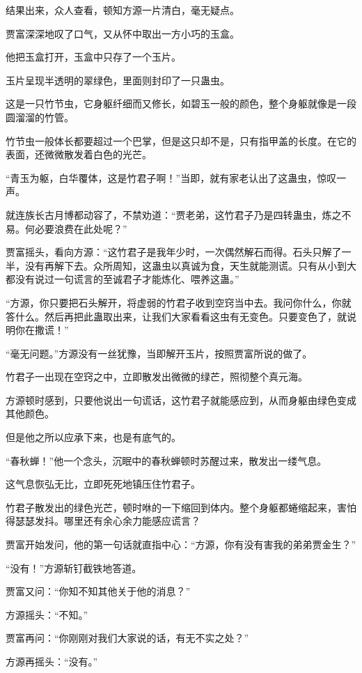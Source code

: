 \begin{this_body}
结果出来，众人查看，顿知方源一片清白，毫无疑点。

贾富深深地叹了口气，又从怀中取出一方小巧的玉盒。

他把玉盒打开，玉盒中只存了一个玉片。

玉片呈现半透明的翠绿色，里面则封印了一只蛊虫。

这是一只竹节虫，它身躯纤细而又修长，如碧玉一般的颜色，整个身躯就像是一段圆溜溜的竹管。

竹节虫一般体长都要超过一个巴掌，但是这只却不是，只有指甲盖的长度。在它的表面，还微微散发着白色的光芒。

“青玉为躯，白华覆体，这是竹君子啊！”当即，就有家老认出了这蛊虫，惊叹一声。

就连族长古月博都动容了，不禁劝道：“贾老弟，这竹君子乃是四转蛊虫，炼之不易。何必要浪费在此处呢？”

贾富摇头，看向方源：“这竹君子是我年少时，一次偶然解石而得。石头只解了一半，没有再解下去。众所周知，这蛊虫以真诚为食，天生就能测谎。只有从小到大都没有说过一句谎言的至诚君子才能炼化、喂养这蛊。”

“方源，你只要把石头解开，将虚弱的竹君子收到空窍当中去。我问你什么，你就答什么。然后再把此蛊取出来，让我们大家看看这虫有无变色。只要变色了，就说明你在撒谎！”

“毫无问题。”方源没有一丝犹豫，当即解开玉片，按照贾富所说的做了。

竹君子一出现在空窍之中，立即散发出微微的绿芒，照彻整个真元海。

方源顿时感到，只要他说出一句谎话，这竹君子就能感应到，从而身躯由绿色变成其他颜色。

但是他之所以应承下来，也是有底气的。

“春秋蝉！”他一个念头，沉眠中的春秋蝉顿时苏醒过来，散发出一缕气息。

这气息恢弘无比，立即死死地镇压住竹君子。

竹君子散发出的绿色光芒，顿时咻的一下缩回到体内。整个身躯都蜷缩起来，害怕得瑟瑟发抖。哪里还有余心余力能感应谎言？

贾富开始发问，他的第一句话就直指中心：“方源，你有没有害我的弟弟贾金生？”

“没有！”方源斩钉截铁地答道。

贾富又问：“你知不知其他关于他的消息？”

方源摇头：“不知。”

贾富再问：“你刚刚对我们大家说的话，有无不实之处？”

方源再摇头：“没有。”


\end{this_body}
